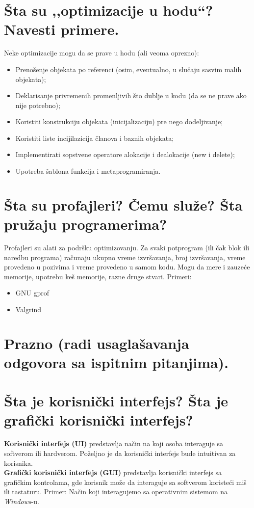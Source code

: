 \documentclass[a4paper]{article}
\begin{document}
\section{Šta su ,,optimizacije u hodu``? Navesti primere.}
  
  Neke optimizacije mogu da se prave u hodu (ali veoma oprezno):
  \begin{itemize}
    \item Prenošenje objekata po referenci (osim, eventualno, u slučaju sasvim malih objekata);
    \item Deklarisanje privremenih promenljivih što dublje u kodu (da se ne prave ako nije potrebno);
    \item Koristiti konstrukciju objekata (inicijalizaciju) pre nego dodeljivanje;
    \item Koristiti liste incijilazicija članova i baznih objekata;
    \item Implementirati sopstvene operatore alokacije i dealokacije (new i delete);
    \item Upotreba šablona funkcija i metaprogramiranja.
  \end{itemize}
\section{Šta su profajleri? Čemu služe? Šta pružaju programerima?}
  Profajleri su alati za podršku optimizovanju. Za svaki potprogram 
  (ili čak blok ili naredbu programa) računaju ukupno vreme izvršavanja, 
  broj izvršavanja, vreme provedeno u pozivima i vreme provedeno u samom kodu.
  Mogu da mere i zauzeće memorije, upotrebu keš memorije, razne druge stvari. Primeri:
  \begin{itemize}
    \item GNU gprof
    \item Valgrind
  \end{itemize}

\section{Prazno (radi usaglašavanja odgovora sa ispitnim pitanjima).}

\section{Šta je korisnički interfejs? Šta je grafički korisnički interfejs?}
  \textbf{Korisnički interfejs (UI)} predstavlja način na koji osoba interaguje sa 
  softverom ili hardverom. Poželjno je da korisnički interfejs bude intuitivan za
  korisnika. \\
  \indent \textbf{Grafički korisnički interfejs (GUI)} predstavlja korisnički interfejs
  sa grafičkim kontrolama, gde korisnik može da interaguje sa softverom koristeći
  miš ili tastaturu. Primer: Način koji interagujemo sa operativnim sistemom na \textit{Windows}-u.
\end{document}
